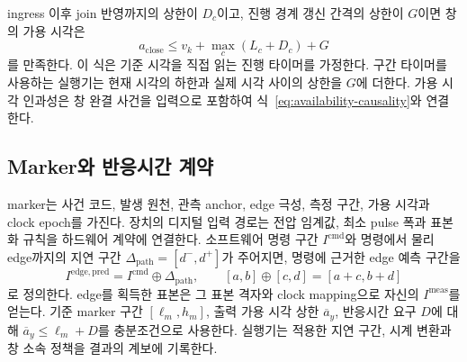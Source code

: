 ingress 이후 join 반영까지의 상한이 $D_c$이고,
진행 경계 갱신 간격의 상한이 $G$이면 창의 가용 시각은
\begin{equation}
 a_{\mathrm{close}}\le v_k+\max_c(L_c+D_c)+G
 \label{eq:window-availability-bound}
\end{equation}
를 만족한다. 이 식은 기준 시각을 직접 읽는 진행 타이머를 가정한다.
구간 타이머를 사용하는 실행기는 현재 시각의 하한과 실제 시각 사이의 상한을 $G$에 더한다.
가용 시각 인과성은 창 완결 사건을 입력으로 포함하여
식~\eqref{eq:availability-causality}와 연결한다.

\subsection{Marker와 반응시간 계약}

marker는 사건 코드, 발생 원천, 관측 anchor, edge 극성,
측정 구간, 가용 시각과 clock epoch를 가진다.
장치의 디지털 입력 경로는 전압 임계값, 최소 pulse 폭과 표본화 규칙을
하드웨어 계약에 연결한다. 소프트웨어 명령 구간 $I^{\mathrm{cmd}}$와
명령에서 물리 edge까지의 지연 구간 $\Delta_{\mathrm{path}}=[d^-,d^+]$가 주어지면,
명령에 근거한 edge 예측 구간을
\begin{equation}
 I^{\mathrm{edge,pred}}=I^{\mathrm{cmd}}\oplus\Delta_{\mathrm{path}},
 \qquad
 [a,b]\oplus[c,d]=[a+c,b+d]
 \label{eq:marker-delay}
\end{equation}
로 정의한다. edge를 획득한 표본은 그 표본 격자와 clock mapping으로
자신의 $I^{\mathrm{meas}}$를 얻는다.
기준 marker 구간 $[\ell_m,h_m]$, 출력 가용 시각 상한 $\overline a_y$,
반응시간 요구 $D$에 대해
$\overline a_y\le\ell_m+D$를 충분조건으로 사용한다.
실행기는 적용한 지연 구간, 시계 변환과 창 소속 정책을 결과의 계보에 기록한다.
